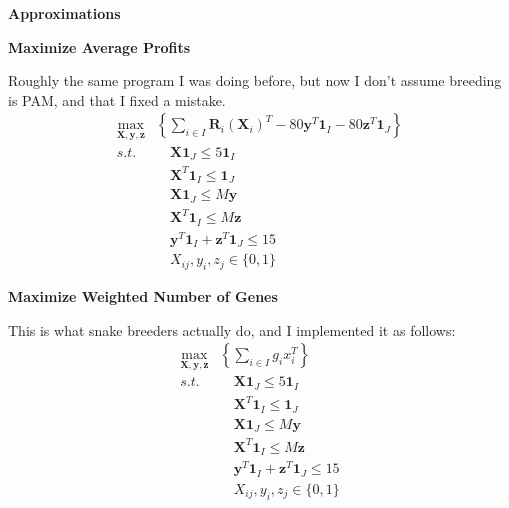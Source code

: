 \documentclass[grey,handout]{beamer}
\renewcommand{\frametitle}[1]{\begin{center}\textbf{#1}\end{center}}
\begin{document}
\begin{frame}
  \frametitle{Approximations}
  \end{frame}
  \begin{frame}
  \frametitle{Maximize Average Profits}
  Roughly the same program I was doing before, but now I don't assume breeding is PAM, and that I fixed a mistake.
  \begin{align*}
      \max_{\mathbf{X},\mathbf{y},\mathbf{z}}&\left\{ \sum_{i\in I}\mathbf R_i (\mathbf X_i)^T - 80\mathbf y^T\mathbf 1_I - 80\mathbf z^T\mathbf 1_J \right\}\\
      s.t. & \quad\mathbf X\mathbf 1_J \leq 5\mathbf 1_I \\
      &\quad \mathbf X^T \mathbf 1_I \leq \mathbf1_J\\
      &\quad \mathbf X \mathbf1_J\leq M\mathbf y\\
      & \quad\mathbf X^T\mathbf 1_I \leq M\mathbf z\\
      &\quad \mathbf y^T\mathbf 1_I + \mathbf z^T\mathbf 1_J \leq 15\\
      & \quad X_{ij}, y_i, z_j \in \{0,1\}
    \end{align*}
    \end{frame}
    \begin{frame}
    \frametitle{Maximize Weighted Number of Genes}
    This is what snake breeders actually do, and I implemented it as follows:
    \begin{align*}
    \max_{\mathbf{X},\mathbf{y},\mathbf{z}}&\left\{ \sum_{i\in I} g_i x_i^T  \right\}\\
      s.t. & \quad\mathbf X\mathbf 1_J \leq 5\mathbf 1_I \\
      &\quad \mathbf X^T \mathbf 1_I \leq \mathbf1_J\\
      &\quad \mathbf X \mathbf1_J\leq M\mathbf y\\
      & \quad\mathbf X^T\mathbf 1_I \leq M\mathbf z\\
      &\quad \mathbf y^T\mathbf 1_I + \mathbf z^T\mathbf 1_J \leq 15\\
      & \quad X_{ij}, y_i, z_j \in \{0,1\}
    \end{align*}
    \end{frame}
\end{document}
